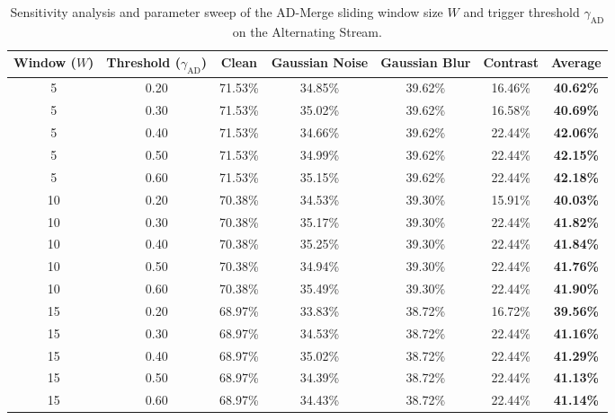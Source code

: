 \documentclass{article}
\theoremstyle{plain}
\theoremstyle{definition}
\theoremstyle{remark}
\begin{document}
\begin{table}[H]
\caption{Sensitivity analysis and parameter sweep of the AD-Merge sliding window size $W$ and trigger threshold $\gamma_{\text{AD}}$ on the Alternating Stream.}
\label{tab:ad_merge_sweep_table}
\vskip 0.15in
\begin{center}
\begin{small}
\begin{sc}
\begin{tabular}{ccccccc}
\toprule
Window ($W$) & Threshold ($\gamma_{\text{AD}}$) & Clean & Gaussian Noise & Gaussian Blur & Contrast & Average \\
\midrule
5 & 0.20 & 71.53\% & 34.85\% & 39.62\% & 16.46\% & \textbf{40.62\%} \\
5 & 0.30 & 71.53\% & 35.02\% & 39.62\% & 16.58\% & \textbf{40.69\%} \\
5 & 0.40 & 71.53\% & 34.66\% & 39.62\% & 22.44\% & \textbf{42.06\%} \\
5 & 0.50 & 71.53\% & 34.99\% & 39.62\% & 22.44\% & \textbf{42.15\%} \\
5 & 0.60 & 71.53\% & 35.15\% & 39.62\% & 22.44\% & \textbf{42.18\%} \\
\midrule
10 & 0.20 & 70.38\% & 34.53\% & 39.30\% & 15.91\% & \textbf{40.03\%} \\
10 & 0.30 & 70.38\% & 35.17\% & 39.30\% & 22.44\% & \textbf{41.82\%} \\
10 & 0.40 & 70.38\% & 35.25\% & 39.30\% & 22.44\% & \textbf{41.84\%} \\
10 & 0.50 & 70.38\% & 34.94\% & 39.30\% & 22.44\% & \textbf{41.76\%} \\
10 & 0.60 & 70.38\% & 35.49\% & 39.30\% & 22.44\% & \textbf{41.90\%} \\
\midrule
15 & 0.20 & 68.97\% & 33.83\% & 38.72\% & 16.72\% & \textbf{39.56\%} \\
15 & 0.30 & 68.97\% & 34.53\% & 38.72\% & 22.44\% & \textbf{41.16\%} \\
15 & 0.40 & 68.97\% & 35.02\% & 38.72\% & 22.44\% & \textbf{41.29\%} \\
15 & 0.50 & 68.97\% & 34.39\% & 38.72\% & 22.44\% & \textbf{41.13\%} \\
15 & 0.60 & 68.97\% & 34.43\% & 38.72\% & 22.44\% & \textbf{41.14\%} \\
\bottomrule
\end{tabular}
\end{sc}
\end{small}
\end{center}
\vskip -0.1in
\end{table}
\end{document}
